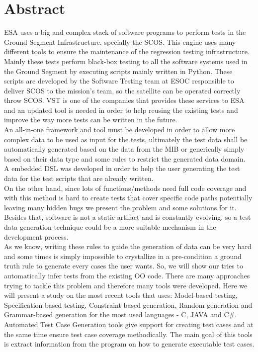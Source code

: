 \chapter*{Abstract}
\ac{ESA} uses a big and complex stack of software programs to perform tests in the
Ground Segment Infrastructure, specially the \ac{SCOS}.
This engine uses many different tools to ensure the maintenance of the
regression testing infrastructure. Mainly these tests perform black-box
testing to all the software systems used in the Ground Segment by executing scripts mainly written in Python.
These scripts are developed by the Software Testing team at \ac{ESOC} responsible to deliver \ac{SCOS} to the mission's team, so the
satellite can be operated correctly throw \ac{SCOS}.
\ac{VST} is one of the companies that provides
these services to \ac{ESA} and an updated tool is needed in order to help reusing the existing tests
and improve the way more tests can be written in the future.\\

An all-in-one framework and tool must be developed in order to allow more complex data to be used as input for the
tests, ultimately the test data shall be automatically generated based on the data from
the \ac{MIB} or generically simply based on their data type
and some rules to restrict the generated data domain.\\
A embedded \ac{DSL} was developed in order to help the user generating the test data for the test scripts that are already written.\\

On the other hand, since lots of functions/methods need full code coverage and with this method is hard to create tests that
cover specific code paths potentially leaving many hidden bugs we present the problem and some solutions for it.
Besides that, software is not a static artifact and is constantly
evolving, so a test data generation technique could be a more suitable mechanism in the development process.\\

As we know, writing these rules to guide the generation of data can be very hard and some times is simply impossible to
crystallize in a pre-condition a ground truth rule to generate every cases the user wants.
So, we will show our tries to automatically infer tests from the existing \ac{OO} code.
There are many approaches trying to tackle this problem and therefore
many tools were developed. Here we will present a study on the most
recent tools that uses: Model-based testing, Specification-based
testing, Constraint-based generation, Random generation and
Grammar-based generation for the most used languages - C, JAVA and C\#.\\
Automated Test Case Generation tools give support for creating test
cases and at the same time ensure test case coverage methodically. The
main goal of this tools is extract information from the program on how
to generate executable test cases.

